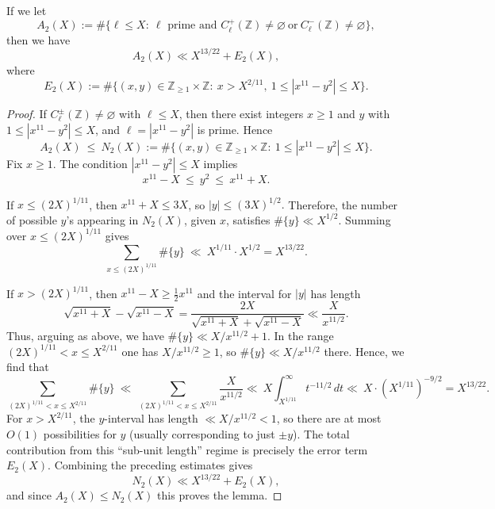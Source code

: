 \documentclass[10pt,a4paper]{amsart}
\begin{document}
\begin{lemma}\label{lem:X2count}
If we let
\[
A_2(X):=\#\{\ell\le X:\ \ell \text{ prime and } C_{\ell}^{+}(\mathbb Z)\neq \varnothing\ \text{or}\ C_{\ell}^{-}(\mathbb Z)\neq \varnothing\},
\]
then we have
\[
A_2(X)\ll X^{13/22}+E_2(X),
\]
where
\[
E_2(X):=\#\{(x,y)\in\mathbb Z_{\ge 1}\times\mathbb Z:\ x> X^{2/11},\ 1\le |x^{11}-y^2|\le X\}.
\]
\end{lemma}

\begin{proof}
If $C_{\ell}^{\pm}(\mathbb Z)\neq\varnothing$ with $\ell\le X$,
then there exist integers $x\ge 1$ and $y$ with
$1\le |x^{11}-y^2|\le X$, and $\ell=|x^{11}-y^2|$ is prime. Hence
\[
A_2(X)\ \le\ N_2(X):=\#\{(x,y)\in\mathbb Z_{\ge 1}\times \mathbb Z:\ 1\le |x^{11}-y^2|\le X\}.
\]
Fix $x\ge 1$. The condition $|x^{11}-y^2|\le X$ implies
\[
x^{11}-X\ \le\ y^2\ \le\ x^{11}+X.
\]

If $x\le (2X)^{1/11}$, then $x^{11}+X\le 3X$, so $|y|\le (3X)^{1/2}.$  Therefore, the number of possible $y$'s appearing in $N_2(X)$, given $x$, satisfies
$\#\{y\}\ll X^{1/2}$.
Summing over $x\le (2X)^{1/11}$ gives
\[
\sum_{x\le (2X)^{1/11}}\#\{y\}\ \ll\ X^{1/11}\cdot X^{1/2}=X^{13/22}.
\]

If $x> (2X)^{1/11}$, then $x^{11}-X\ge \tfrac12 x^{11}$ and the interval for $|y|$ has length
\[
\sqrt{x^{11}+X}-\sqrt{x^{11}-X}
=\frac{2X}{\sqrt{x^{11}+X}+\sqrt{x^{11}-X}}
\ll \frac{X}{x^{11/2}}.
\]
Thus, arguing as above, we have $\#\{y\}\ll X/x^{11/2}+1$. In the range $(2X)^{1/11}<x\le X^{2/11}$ one has $X/x^{11/2}\ge 1$, so
$\#\{y\}\ll X/x^{11/2}$ there. Hence, we find that
\[
\sum_{(2X)^{1/11}<x\le X^{2/11}}\#\{y\}\ \ll\ \sum_{(2X)^{1/11}<x\le X^{2/11}}\frac{X}{x^{11/2}}
\ll\ X\int_{X^{1/11}}^\infty t^{-11/2}\,dt
\ll\ X\cdot (X^{1/11})^{-9/2}
= X^{13/22}.
\]
For $x> X^{2/11}$, the $y$-interval has length $\ll X/x^{11/2}<1$,
so there are at most $O(1)$ possibilities for $y$ (usually corresponding to just $\pm y$).
The total contribution from this ``sub-unit length'' regime is precisely the error term $E_2(X)$.
Combining the preceding estimates gives
\[
N_2(X)\ll X^{13/22}+E_2(X),
\]
and since $A_2(X)\le N_2(X)$ this proves the lemma.
\end{proof}
\end{document}
